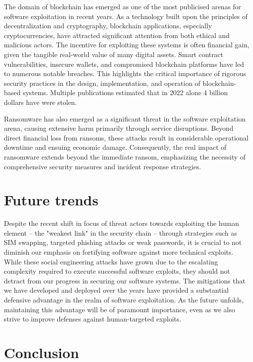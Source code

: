 \documentclass{article}
\begin{document}
The domain of blockchain has emerged as one of the most publicised arenas for
software exploitation in recent years. As a technology built upon the principles
of decentralization and cryptography, blockchain applications, especially
cryptocurrencies, have attracted significant attention from both ethical and
malicious actors. The incentive for exploiting these systems is often financial
gain, given the tangible real-world value of many digital assets. Smart contract
vulnerabilities, insecure wallets, and compromised blockchain platforms have led
to numerous notable breaches. This highlights the critical importance of
rigorous security practices in the design, implementation, and operation of
blockchain-based systems. Multiple publications estimated that in 2022 alone
4 billion dollars have were stolen.

Ransomware has also emerged as a significant threat in the software exploitation
arena, causing extensive harm primarily through service disruptions. Beyond
direct financial loss from ransoms, these attacks result in considerable
operational downtime and ensuing economic damage. Consequently, the real impact
of ransomware extends beyond the immediate ransom, emphasizing the necessity of
comprehensive security measures and incident response strategies.

\section{Future trends}%
Despite the recent shift in focus of threat actors towards exploiting the human
element -- the "weakest link" in the security chain -- through strategies such
as SIM swapping, targeted phishing attacks or weak passwords, it is crucial to
not diminish our emphasis on fortifying software against more technical
exploits. While these social engineering attacks have grown due to the
escalating complexity required to execute successful software exploits, they
should not detract from our progress in securing our software systems. The
mitigations that we have developed and deployed over the years have provided a
substantial defensive advantage in the realm of software exploitation. As the
future unfolds, maintaining this advantage will be of paramount importance, even
as we also strive to improve defenses against human-targeted
exploits.\cite{jones2021}\cite{smith2022}

\section{Conclusion}

\printbibheading
\printbibliography
\printbibliography[nottype=book,heading=subbibliography,title={Other Sources}]
\end{document}
